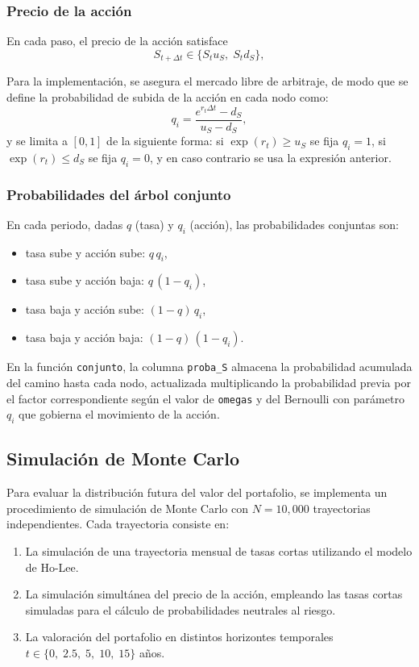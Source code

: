 \documentclass[12pt, a4paper]{article}
\begin{document}
\subsubsection*{Precio de la acción}

En cada paso, el precio de la acción satisface
$$
S_{t+\Delta t} \in \{ S_t u_S,\; S_t d_S \},
$$

Para la implementación, se asegura el mercado libre de arbitraje, de modo que se define la probabilidad de subida de la acción en cada nodo como:
$$
q_i = \frac{e^{r_t \Delta t} - d_S}{u_S - d_S},
$$
y se limita a $[0,1]$ de la siguiente forma: si $\exp(r_t) \ge u_S$ se fija $q_i = 1$, si $\exp(r_t) \le d_S$ se fija $q_i = 0$, y en caso contrario se usa la expresión anterior.

\subsubsection*{Probabilidades del árbol conjunto}

En cada periodo, dadas $q$ (tasa) y $q_i$ (acción), las probabilidades conjuntas son:
\begin{itemize}
  \item tasa sube y acción sube: $q\,q_i$,
  \item tasa sube y acción baja: $q\,(1 - q_i)$,
  \item tasa baja y acción sube: $(1 - q)\,q_i$,
  \item tasa baja y acción baja: $(1 - q)\,(1 - q_i)$.
\end{itemize}

En la función \texttt{conjunto}, la columna \texttt{proba\_S} almacena la probabilidad acumulada del camino hasta cada nodo, actualizada multiplicando la probabilidad previa por el factor correspondiente según el valor de \texttt{omegas} y del Bernoulli con parámetro $q_i$ que gobierna el movimiento de la acción.

\subsection{Simulación de Monte Carlo}

Para evaluar la distribución futura del valor del portafolio, se implementa un procedimiento de simulación de Monte Carlo con \(N = 10{,}000\) trayectorias independientes. Cada trayectoria consiste en:

\begin{enumerate}
  \item La simulación de una trayectoria mensual de tasas cortas utilizando el modelo de Ho-Lee.
  \item La simulación simultánea del precio de la acción, empleando las tasas cortas simuladas para el cálculo de probabilidades neutrales al riesgo.
  \item La valoración del portafolio en distintos horizontes temporales \(t \in \{0,\;2.5,\;5,\;10,\;15\}\) años.
\end{enumerate}
\end{document}
